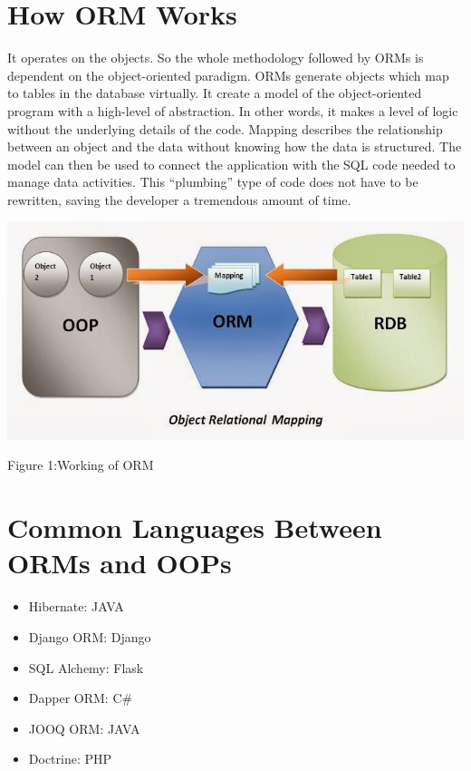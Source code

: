 \documentclass[10pt,a4paper,twoside]{article}
\begin{document}
\section{How ORM Works}
It operates on the objects. So the whole methodology followed by ORMs is dependent on the object-oriented paradigm. ORMs generate objects which map to tables in the database virtually. It create a model of the object-oriented program with a high-level of abstraction. In other words, it makes a level of logic without the underlying details of the code. Mapping describes the relationship between an object and the data without knowing how the data is structured. The model can then be used to connect the application with the SQL code needed to manage data activities. This “plumbing” type of code does not have to be rewritten, saving the developer a tremendous amount of time.
\item
\begin{figure1}
  \includegraphics[width=\linewidth]{./images/orm1.JPG}
  \caption{Figure 1:Working of ORM}
  \label{fig:ORM}
\end{figure1}


\section{Common Languages Between ORMs and OOPs}
\begin{itemize}
\item  Hibernate: JAVA
\item     Django ORM: Django
\item     SQL Alchemy: Flask
\item     Dapper ORM: C\#
\item     JOOQ ORM: JAVA
\item     Doctrine: PHP
\end{itemize}
\end{document}
